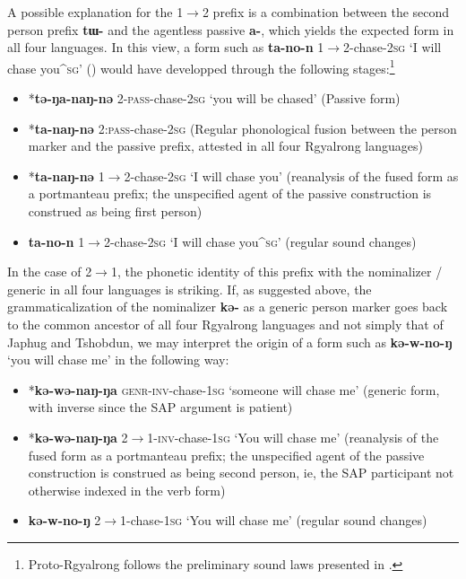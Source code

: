 \documentclass[oldfontcommands,oneside,a4paper,11pt]{article}
\newcommand{\ipa}[1]{\mbox{\phon\textbf{#1}}} %
\begin{document}
  A possible explanation for the 1$\rightarrow$2  prefix is a combination between the second person prefix \ipa{tɯ-} and the agentless passive \ipa{a-}, which yields the expected form in all four languages. In this view, a form such as \ipa{ta-no-n} 1$\rightarrow$2-chase-\textsc{2sg} `I will chase you^{\textsc{sg}}' (\citealt[219]{linxr93jiarong}) would have developped through the following stages:\footnote{Proto-Rgyalrong follows the preliminary sound laws presented in \citet{jacques04these}.}

\begin{itemize}
\item *\ipa{tə-ŋa-naŋ-nə}  2-\textsc{pass}-chase-\textsc{2sg} `you will be chased' (Passive form)
\item *\ipa{ta-naŋ-nə}  2:\textsc{pass}-chase-\textsc{2sg} (Regular phonological fusion between the person marker and the passive prefix, attested in all four Rgyalrong languages)  
\item  *\ipa{ta-naŋ-nə}  1$\rightarrow$2-chase-\textsc{2sg} `I will chase you' (reanalysis of the fused form as a portmanteau prefix; the unspecified agent of the passive construction is construed as being first person)
\item  \ipa{ta-no-n} 1$\rightarrow$2-chase-\textsc{2sg} `I will chase you^{\textsc{sg}}' (regular sound changes)
\end{itemize}


In the case of 2$\rightarrow$1, the phonetic identity of this prefix with the nominalizer / generic in all four languages is striking. If, as suggested above, the grammaticalization of the nominalizer \ipa{kə-} as a generic person marker goes back to the common ancestor of all four Rgyalrong languages and not simply that of Japhug and Tshobdun, we may interpret the origin of a form such as \ipa{kə-w-no-ŋ} `you will chase me' in the following way:


\begin{itemize}
\item *\ipa{kə-wə-naŋ-ŋa}  \textsc{genr}-\textsc{inv}-chase-\textsc{1sg} `someone will chase me' (generic form, with inverse since the SAP argument is patient)
\item  *\ipa{kə-wə-naŋ-ŋa}  2$\rightarrow$1-\textsc{inv}-chase-\textsc{1sg} `You will chase me' (reanalysis of the fused form as a portmanteau prefix; the unspecified agent of the passive construction is construed as being second person, ie, the SAP participant not otherwise indexed in the verb form)
\item  \ipa{kə-w-no-ŋ} 2$\rightarrow$1-chase-\textsc{1sg} `You will chase me'  (regular sound changes)
\end{itemize}
\end{document}
